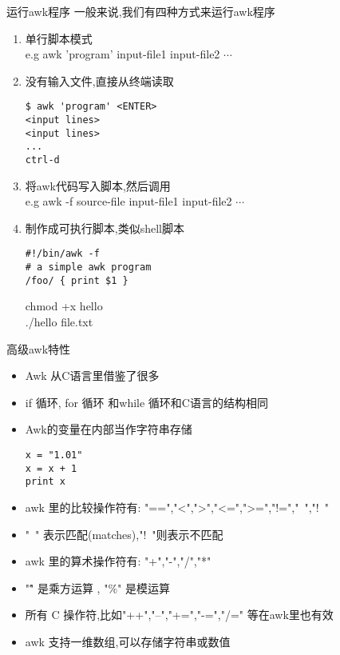 \begin{frame}{运行awk程序}
一般来说,我们有四种方式来运行awk程序
\begin{enumerate}
\item 单行脚本模式 \\
  e.g  awk 'program' input-file1 input-file2  $\cdots$
\item 没有输入文件,直接从终端读取 \\
\begin{verbatim}
$ awk 'program' <ENTER>
<input lines>
<input lines>
...
ctrl-d
\end{verbatim}
\item 将awk代码写入脚本,然后调用 \\
e.g  awk -f source-file input-file1 input-file2 $\cdots$

\item 制作成可执行脚本,类似shell脚本
\begin{verbatim}
#!/bin/awk -f 
# a simple awk program
/foo/ { print $1 }
\end{verbatim}
chmod +x hello \\
./hello file.txt
\end{enumerate}
\end{frame}

\begin{frame}{高级awk特性}
\begin{itemize}
\item Awk 从C语言里借鉴了很多
\item if 循环, for 循环 和while 循环和C语言的结构相同
\item Awk的变量在内部当作字符串存储 \\
\begin{verbatim}
x = "1.01"
x = x + 1
print x
\end{verbatim}
\item awk 里的比较操作符有: "==","<",">","<=",">=","!=","~","!~"

\item "~" 表示匹配(matches),"!~"则表示不匹配

\item awk 里的算术操作符有: "+","-","/","*"
\item "\^" 是乘方运算 , "\%" 是模运算
\item 所有 C 操作符,比如"++","--","+=","-=","/=" 等在awk里也有效
\item awk 支持一维数组,可以存储字符串或数值
\end{itemize}
\end{frame}

